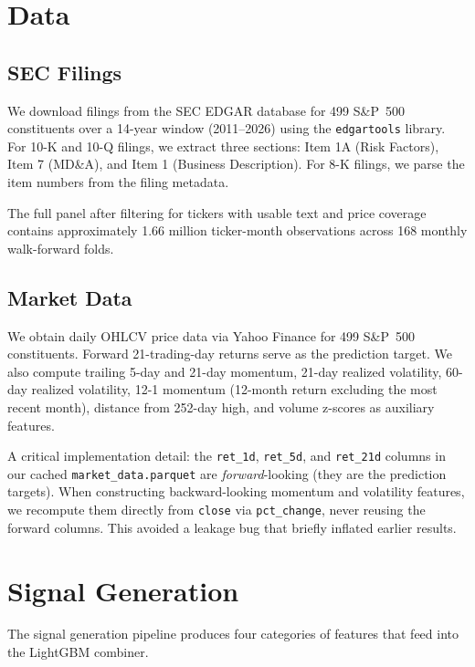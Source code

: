 \documentclass[11pt,a4paper]{article}
\begin{document}
\section{Data}
\label{sec:data}

\subsection{SEC Filings}

We download filings from the SEC EDGAR database for 499 S\&P~500 constituents over a 14-year window (2011--2026) using the \texttt{edgartools} library. For 10-K and 10-Q filings, we extract three sections: Item 1A (Risk Factors), Item 7 (MD\&A), and Item 1 (Business Description). For 8-K filings, we parse the item numbers from the filing metadata.

The full panel after filtering for tickers with usable text and price coverage contains approximately 1.66 million ticker-month observations across 168 monthly walk-forward folds.

\subsection{Market Data}

We obtain daily OHLCV price data via Yahoo Finance for 499 S\&P~500 constituents. Forward 21-trading-day returns serve as the prediction target. We also compute trailing 5-day and 21-day momentum, 21-day realized volatility, 60-day realized volatility, 12-1 momentum (12-month return excluding the most recent month), distance from 252-day high, and volume z-scores as auxiliary features.

A critical implementation detail: the \texttt{ret\_1d}, \texttt{ret\_5d}, and \texttt{ret\_21d} columns in our cached \texttt{market\_data.parquet} are \emph{forward}-looking (they are the prediction targets). When constructing backward-looking momentum and volatility features, we recompute them directly from \texttt{close} via \texttt{pct\_change}, never reusing the forward columns. This avoided a leakage bug that briefly inflated earlier results.

\section{Signal Generation}
\label{sec:signals}

The signal generation pipeline produces four categories of features that feed into the LightGBM combiner.
\end{document}
